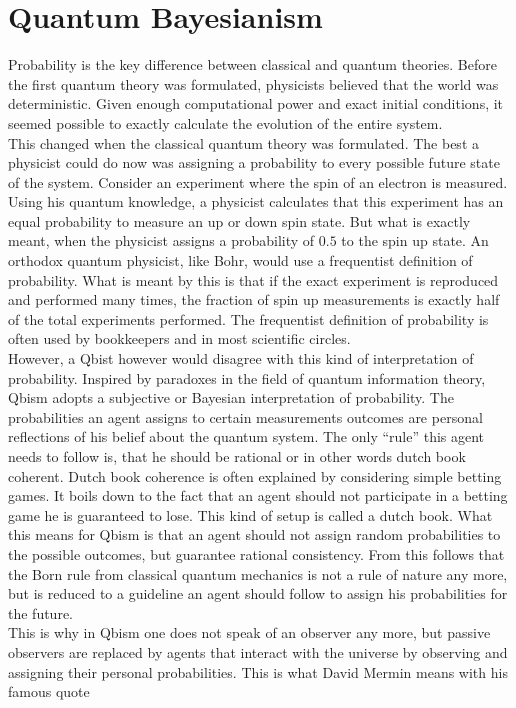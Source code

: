 \documentclass[11pt, a4 paper]{article}
\begin{document}
\section{Quantum Bayesianism}
\begin{multicols}{2}
Probability is the key difference between classical and quantum theories. Before the first quantum theory was formulated, physicists believed that the world was deterministic. Given enough computational power and exact initial conditions, it seemed possible to exactly calculate the evolution of the entire system.\\
This changed when the classical quantum theory was formulated. The best a physicist could do now was assigning a probability to every possible future state of the system. Consider an experiment where the spin of an electron is measured. Using his quantum knowledge, a physicist calculates that this experiment has an equal probability to measure an up or down spin state. But what is exactly meant, when the physicist assigns a probability of $0.5$ to the spin up state. An orthodox quantum physicist, like Bohr, would use a frequentist definition of probability\cite{prob}. What is meant by this is that if the exact experiment is reproduced and performed many times, the fraction of spin up measurements is exactly half of the total experiments performed. The  frequentist definition of probability is often used by bookkeepers and in most scientific circles.\\
However, a Qbist however would disagree with this kind of interpretation of probability. Inspired by paradoxes in the field of quantum information theory, Qbism adopts a subjective or Bayesian interpretation of probability. The probabilities an agent assigns to certain measurements outcomes are personal reflections of his belief about the quantum system. The only ``rule'' this agent needs to follow is, that he should be rational or in other words dutch book coherent. Dutch book coherence is often explained by considering simple betting games. It boils down to the fact that an agent should not participate in a betting game he is guaranteed to lose. This kind of setup is called a dutch book. What this means for Qbism is that an agent should not assign random probabilities to the possible outcomes, but guarantee rational consistency. From this follows that the Born rule from classical quantum mechanics is not a rule of nature any more, but is reduced to a guideline an agent should follow to assign his probabilities for the future.\\
This is why in Qbism one does not speak of an observer any more, but passive observers are replaced by agents that interact with the universe by observing and assigning their personal probabilities. This is what David Mermin means with his famous quote

\end{multicols}
\end{document}
